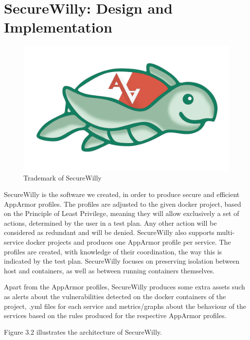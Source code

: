 \chapter{SecureWilly: Design and Implementation}
\begin{figure}[h!]
   \centering
   \includegraphics[width=0.45\linewidth]{../figures/trt.png}
   \caption{Trademark of SecureWilly}
\end{figure}

SecureWilly is the software we created, in order to produce secure and efficient AppArmor profiles. The profiles are adjusted to the given docker project, based on the Principle of Least Privilege, meaning they will allow exclusively a set of actions, determined by the user in a test plan. Any other action will be considered as redundant and will be denied. SecureWilly also supports multi-service docker projects and produces one AppArmor profile per service. The profiles are created, with knowledge of their coordination, the way this is indicated by the test plan. SecureWilly focuses on preserving isolation between host and containers, as well as between running containers themselves.

Apart from the AppArmor profiles, SecureWilly produces some extra assets such as alerts about the vulnerabilities detected on the docker containers of the project, .yml files for each service and metrics/graphs about the behaviour of the services based on the rules produced for the respective AppArmor profiles. 

Figure 3.2 illustrates the architecture of SecureWilly.

